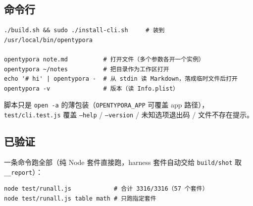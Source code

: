 \documentclass[11pt,a4paper]{ctexart}
\begin{document}
\subsection{命令行}

\begin{verbatim}
./build.sh && sudo ./install-cli.sh     # 装到 /usr/local/bin/opentypora

opentypora note.md          # 打开文件（多个参数各开一个实例）
opentypora ~/notes          # 把目录作为工作区打开
echo '# hi' | opentypora -  # 从 stdin 读 Markdown，落成临时文件后打开
opentypora -v               # 版本（读 Info.plist）
\end{verbatim}

脚本只是 \texttt{open -a} 的薄包装（\texttt{OPENTYPORA\_APP} 可覆盖 app 路径），\texttt{test/cli.test.js}
覆盖 \texttt{--help} / \texttt{--version} / 未知选项退出码 / 文件不存在提示。

\subsection{已验证}

一条命令跑全部（纯 Node 套件直接跑，harness 套件自动交给 \texttt{build/shot} 取 \texttt{\_\_report}）：

\begin{verbatim}
node test/runall.js            # 合计 3316/3316（57 个套件）
node test/runall.js table math # 只跑指定套件
\end{verbatim}
\end{document}
